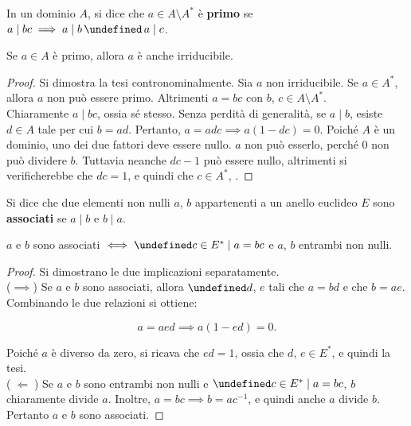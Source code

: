 \documentclass[a4paper]{article}
\let\oldexists\exists
\let\exists\undefined
\DeclareMathOperator{\exists}{\oldexists}
\let\oldlor\lor
\let\lor\undefined
\DeclareMathOperator{\lor}{\oldlor}
\begin{document}
\begin{definition}
    In un dominio $A$, si dice che $a \in A \setminus A^*$ è \textbf{primo} se
    $a \mid bc \implies a \mid b \,\lor\, a \mid c$.
\end{definition}

\begin{proposition}
    Se $a \in A$ è primo, allora $a$ è anche irriducibile.
\end{proposition}

\begin{proof}
    Si dimostra la tesi contronominalmente. Sia $a$ non irriducibile. Se
    $a \in A^*$, allora $a$ non può essere primo. Altrimenti $a=bc$ con
    $b$, $c \in A \setminus A^*$. \\

    Chiaramente $a \mid bc$, ossia sé stesso. Senza perdità di generalità, se $a \mid b$, esiste $d \in A$ tale per cui
    $b=ad$. Pertanto, $a=adc \implies a(1-dc)=0$. Poiché $A$ è un dominio,
    uno dei due fattori deve essere nullo. $a$ non può esserlo, perché $0$ non
    può dividere $b$. Tuttavia neanche $dc-1$ può essere nullo, altrimenti
    si verificherebbe che $dc=1$, e quindi che $c \in A^*$, \Lightning{}.
\end{proof}

\begin{definition}
    Si dice che due elementi non nulli $a$, $b$ appartenenti a un anello euclideo
    $E$ sono \textbf{associati} se $a \mid b$ e $b \mid a$.
\end{definition}

\begin{proposition}
    \label{prop:associati}
    $a$ e $b$ sono associati $\iff \exists c \in E^* \mid a=bc$ e $a$, $b$ entrambi non nulli.
\end{proposition}

\begin{proof} Si dimostrano le due implicazioni separatamente. \\

    ($\implies$) Se $a$ e $b$ sono associati, allora $\exists d$, $e$ tali che $a=bd$ e che $b=ae$. Combinando le due relazioni si ottiene:

    \[ a=aed \implies a(1-ed)=0.\]

    Poiché $a$ è diverso da zero, si ricava che $ed=1$, ossia
    che $d$, $e \in E^*$, e quindi la tesi. \\

    ($\;\Longleftarrow\;$) Se $a$ e $b$ sono entrambi non
    nulli e $\exists c \in E^* \mid a=bc$, $b$ chiaramente
    divide $a$. Inoltre, $a=bc \implies b=ac^{-1}$, e quindi
    anche $a$ divide $b$. Pertanto $a$ e $b$ sono associati.
\end{proof}
\end{document}
